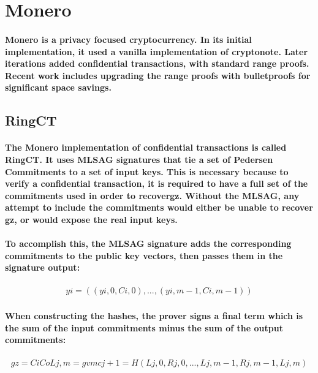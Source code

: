\documentclass{article}
\begin{document}
\section{Monero}

\paragraph{Monero is a privacy focused cryptocurrency.  In its initial implementation, it used a vanilla implementation of cryptonote.  Later iterations added confidential transactions, with standard range proofs.  Recent work includes upgrading the range proofs with bulletproofs for significant space savings.}


\subsection{RingCT}

\paragraph{The Monero implementation of confidential transactions is called RingCT.  It uses MLSAG signatures that tie a set of Pedersen Commitments to a set of input keys.  This is necessary because to verify a confidential transaction, it is required to have a full set of the commitments used in order to recovergz.  Without the MLSAG, any attempt to include the commitments would either be unable to recover gz, or would expose the real input keys.}

\paragraph{To accomplish this, the MLSAG signature adds the corresponding commitments to the public key vectors, then passes them in the signature output:}

\begin{eqnarray}
  yi=((yi,0,Ci,0), ... , (yi,m-1,Ci,m-1))
\end{eqnarray}

\paragraph{When constructing the hashes, the prover signs a final term which is the sum of the input commitments minus the sum of the output commitments:}

\begin{eqnarray}
  gz= Ci Co
  Lj,m=gvm
  cj+1=H(Lj,0, Rj, 0, ... , Lj,m-1, Rj, m-1, Lj,m)
\end{eqnarray}
\end{document}
